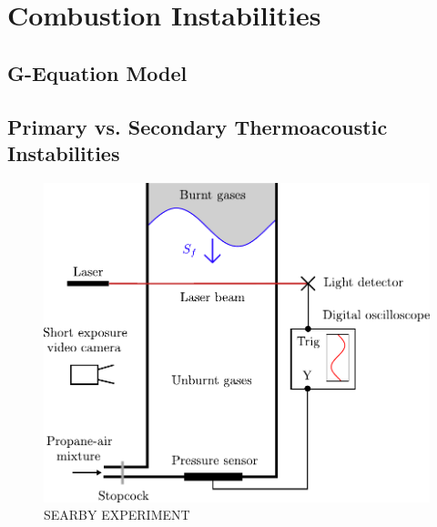 \section{Combustion Instabilities}


\subsection{G-Equation Model}




\subsection{Primary vs. Secondary Thermoacoustic Instabilities}


\begin{figure}[t]
\centering
\includegraphics[scale=0.6]{assets/imgs/Searby-92.pdf}
\caption{SEARBY EXPERIMENT}
\label{fig:searby-experiment}
\end{figure}

